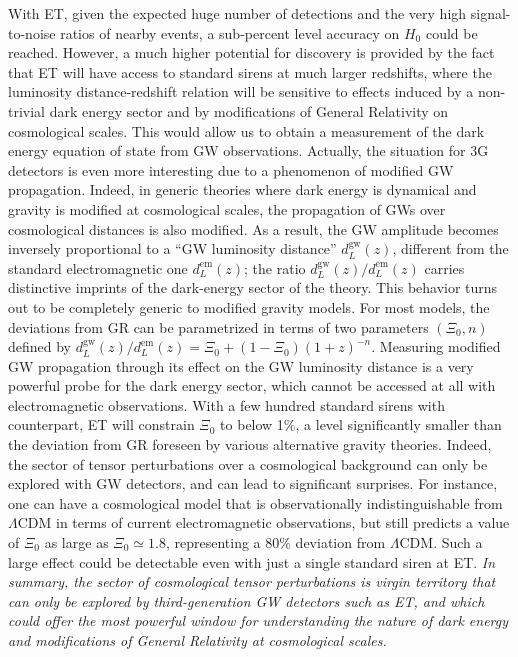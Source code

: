 With ET, given  the expected huge number of detections and the very high signal-to-noise ratios  of nearby  events, a sub-percent level accuracy on $H_0$  could be reached. However,
a much higher potential for discovery is provided by the fact
that ET will have access to standard sirens at much larger redshifts, where the luminosity distance-redshift relation will be sensitive  to effects  induced by a non-trivial  dark energy  sector and by modifications of General Relativity on cosmological scales. This would allow us to obtain a   measurement of the dark energy equation of state from GW observations.
Actually, the situation for 3G detectors is even more interesting due to a phenomenon of modified GW propagation.  
Indeed, in generic theories where dark energy is dynamical and gravity is modified at cosmological scales,  the propagation of GWs over cosmological distances is also modified. 
As a result, the GW amplitude becomes inversely proportional to a ``GW luminosity distance'' $d_L^{\mathrm{gw}}(z)$, different from the standard electromagnetic one $d_L^{\mathrm{em}}(z)$;  the ratio
$d_L^{\mathrm{gw}}(z)/d_L^{\mathrm{em}}(z)$ carries distinctive imprints of the dark-energy sector of the theory. This behavior turns out to be  completely generic to  modified gravity models.%
For most models, the deviations from GR can be parametrized in terms of two parameters $(\Xi_0,n)$   defined by
$d_L^{\mathrm{gw}}(z)/d_L^{\mathrm{em}}(z)=\Xi_0+(1-\Xi_0)(1+z)^{-n}$.%
Measuring  modified GW propagation through its effect on the GW luminosity distance is a very powerful probe for the dark energy sector, which cannot be accessed at all with  electromagnetic  observations. With a few hundred standard sirens with counterpart, ET will constrain $\Xi_0$ to below 1\%, a level significantly  smaller than the deviation from GR foreseen by various alternative gravity theories. Indeed, the sector of tensor perturbations over a cosmological background  can only be explored with  GW detectors, and can lead to significant surprises. For instance, one can have a cosmological model that is  observationally indistinguishable from 
$\Lambda$CDM in terms of current electromagnetic observations,
 but still predicts a value of $\Xi_0$  as large as $\Xi_0\simeq 1.8$, representing a $80\%$ deviation from $\Lambda$CDM.%
Such a large effect could be detectable even with just a single standard siren at ET.
\emph{In summary, the sector of cosmological tensor perturbations is  virgin territory that can only be explored by third-generation GW detectors such as ET, and which could  offer the most powerful window for understanding the nature of dark energy and modifications of General Relativity at cosmological scales.}





